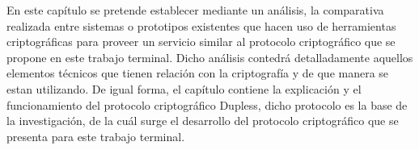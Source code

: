 
En este capítulo se pretende establecer mediante un análisis, la comparativa realizada entre sistemas o prototipos existentes que hacen uso de herramientas criptográficas para proveer un servicio similar al protocolo criptográfico que se propone en este trabajo terminal. Dicho análisis contedrá detalladamente aquellos elementos técnicos que tienen relación con la criptografía y de que manera se estan utilizando. De igual forma, el capítulo contiene la explicación y el funcionamiento del protocolo criptográfico Dupless, dicho protocolo es la base de la investigación, de la cuál surge el desarrollo del protocolo criptográfico que se presenta para este trabajo terminal. 






